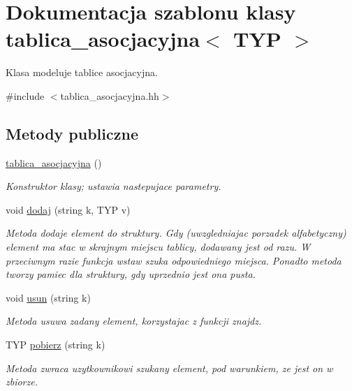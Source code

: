 \hypertarget{classtablica__asocjacyjna}{\section{\-Dokumentacja szablonu klasy tablica\-\_\-asocjacyjna$<$ \-T\-Y\-P $>$}
\label{classtablica__asocjacyjna}
}


\-Klasa modeluje tablice asocjacyjna.  




{\ttfamily \#include $<$tablica\-\_\-asocjacyjna.\-hh$>$}

\subsection*{\-Metody publiczne}
\begin{DoxyCompactItemize}
\item 
\hyperlink{classtablica__asocjacyjna_a9173f2b75f1933696247580da5e5c103}{tablica\-\_\-asocjacyjna} ()
\begin{DoxyCompactList}\small\item\em \-Konstruktor klasy; ustawia nastepujace parametry. \end{DoxyCompactList}\item 
void \hyperlink{classtablica__asocjacyjna_afab8557bd095ee1ba1756a5a195f8ca7}{dodaj} (string k, \-T\-Y\-P v)
\begin{DoxyCompactList}\small\item\em \-Metoda dodaje element do struktury. \-Gdy (uwzgledniajac porzadek alfabetyczny) element ma stac w skrajnym miejscu tablicy, dodawany jest od razu. \-W przeciwnym razie funkcja {\ttfamily wstaw} {\ttfamily szuka} odpowiedniego miejsca. \-Ponadto metoda tworzy pamiec dla struktury, gdy uprzednio jest ona pusta. \end{DoxyCompactList}\item 
void \hyperlink{classtablica__asocjacyjna_ae0d1ac59cdc7a7dd220672a246a7d8ad}{usun} (string k)
\begin{DoxyCompactList}\small\item\em \-Metoda usuwa zadany element, korzystajac z funkcji znajdz. \end{DoxyCompactList}\item 
\-T\-Y\-P \hyperlink{classtablica__asocjacyjna_a45b52661ed6e20e64a686fb55d9aa2f9}{pobierz} (string k)
\begin{DoxyCompactList}\small\item\em \-Metoda zwraca uzytkownikowi szukany element, pod warunkiem, ze jest on w zbiorze. \end{DoxyCompactList}\item 

\end{DoxyCompactItemize}

